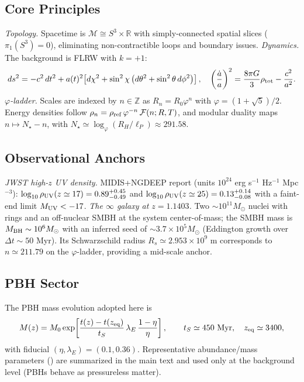 \documentclass[aps,prd,reprint,onecolumn,nofootinbib]{revtex4-2}
\begin{document}
\subsection{Core Principles}
\emph{Topology.} Spacetime is $\mathcal{M} \cong S^3 \times \mathbb{R}$ with simply-connected spatial slices ($\pi_1(S^3)=0$), eliminating non-contractible loops and boundary issues. 
\emph{Dynamics.} The background is FLRW with $k=+1$:
\begin{equation}
ds^2 = -c^2\,dt^2 + a(t)^2\!\left[d\chi^2 + \sin^2\chi \left(d\theta^2 + \sin^2\theta\, d\phi^2\right)\right],\quad
\left(\frac{\dot a}{a}\right)^2 = \frac{8\pi G}{3}\rho_{\rm tot} - \frac{c^2}{a^2}.
\end{equation}
\emph{$\varphi$-ladder.} Scales are indexed by $n\in\mathbb{Z}$ as $R_n = R_0 \varphi^n$ with $\varphi=(1+\sqrt5)/2$. Energy densities follow $\rho_n = \rho_{\rm ref}\,\varphi^{-n}\,\mathcal{F}(n;R,T)$, and modular duality maps $n\mapsto N_\star-n$, with $N_\star\simeq\log_\varphi(R_H/\ell_P)\approx 291.58$.

\subsection{Observational Anchors}
\emph{JWST high-$z$ UV density.} MIDIS+NGDEEP report (units $10^{24}$ erg s$^{-1}$ Hz$^{-1}$ Mpc$^{-3}$): $\log_{10}\rho_{\rm UV}(z\simeq 17)=0.89^{+0.45}_{-0.49}$ and $\log_{10}\rho_{\rm UV}(z\simeq 25)=0.13^{+0.14}_{-0.08}$ with a faint-end limit $M_{\rm UV}<-17$.
\emph{The $\infty$ galaxy at $z=1.1403$.} Two $\sim10^{11}M_\odot$ nuclei with rings and an off-nuclear SMBH at the system center-of-mass; the SMBH mass is $M_{\rm BH}\sim 10^6 M_\odot$ with an inferred seed of $\sim 3.7\times 10^5M_\odot$ (Eddington growth over $\Delta t\sim 50$ Myr). Its Schwarzschild radius $R_s\simeq 2.953\times10^9$ m corresponds to $n\simeq 211.79$ on the $\varphi$-ladder, providing a mid-scale anchor.

\subsection{PBH Sector}
The PBH mass evolution adopted here is
\begin{equation}
M(z)=M_0 \exp\!\left[\frac{t(z)-t(z_{\rm eq})}{t_S}\,\lambda_E\,\frac{1-\eta}{\eta}\right],\qquad
t_S\simeq 450~{\rm Myr},\quad z_{\rm eq}\simeq 3400,
\end{equation}
with fiducial $(\eta,\lambda_E)=(0.1,0.36)$. Representative abundance/mass parameters (\cite{Matteri2025}) are summarized in the main text and used only at the background level (PBHs behave as pressureless matter).
\end{document}
